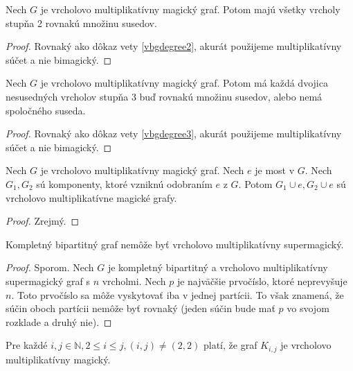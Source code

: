 \begin{theorem} Nech $G$ je vrcholovo multiplikatívny magický graf. Potom majú všetky vrcholy stupňa 2 rovnakú množinu susedov.
\end{theorem}

\begin{proof} Rovnaký ako dôkaz vety \ref{vbgdegree2}, akurát použijeme multiplikatívny súčet a nie bimagický.
\end{proof}

\begin{theorem} Nech $G$ je vrcholovo multiplikatívny magický graf. Potom má každá dvojica nesusedných vrcholov stupňa 3 buď rovnakú množinu susedov, alebo nemá spoločného suseda.
\end{theorem}

\begin{proof} Rovnaký ako dôkaz vety \ref{vbgdegree3}, akurát použijeme multiplikatívny súčet a nie bimagický.
\end{proof}

\begin{theorem} Nech $G$ je vrcholovo multiplikatívny magický graf. Nech $e$ je most v $G$. Nech $G_1, G_2$ sú komponenty, ktoré vzniknú odobraním $e$ z $G$. Potom $G_1 \cup e, G_2 \cup e$ sú vrcholovo multiplikatívne magické grafy. 
\end{theorem}

\begin{proof}
Zrejmý.
\end{proof}

\begin{theorem} Kompletný bipartitný graf nemôže byť vrcholovo multiplikatívny supermagický.
\end{theorem}

\begin{proof} Sporom. Nech $G$ je kompletný bipartitný a vrcholovo multiplikatívny supermagický graf s $n$ vrcholmi. Nech $p$ je najväčšie prvočíslo, ktoré neprevyšuje $n$. Toto prvočíslo sa môže vyskytovať iba v jednej partícii. To však znamená, že súčin oboch partícii nemôže byť rovnaký (jeden súčin bude mať $p$ vo svojom rozklade a druhý nie).
\end{proof}

\begin{theorem}
\label{vmmgkij}
Pre každé $i,j \in \mathbb{N}, 2 \leq i \leq j, (i, j) \neq (2, 2)$ platí, že graf $K_{i,j}$ je vrcholovo multiplikatívny magický.
\end{theorem}

